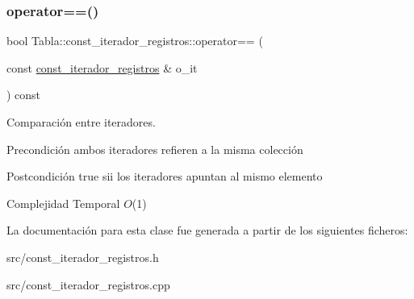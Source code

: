 \subsubsection{\texorpdfstring{operator==()}{operator==()}}
{\footnotesize\ttfamily bool Tabla\+::const\+\_\+iterador\+\_\+registros\+::operator== (\begin{DoxyParamCaption}\item[{const \mbox{\hyperlink{classTabla_1_1const__iterador__registros}{const\+\_\+iterador\+\_\+registros}} \&}]{o\+\_\+it }\end{DoxyParamCaption}) const}



Comparación entre iteradores. 

\begin{DoxyPrecond}{Precondición}
ambos iteradores refieren a la misma colección 
\end{DoxyPrecond}
\begin{DoxyPostcond}{Postcondición}
true sii los iteradores apuntan al mismo elemento
\end{DoxyPostcond}

\begin{DoxyDescription}
\item[Complejidad Temporal]$O$(1)
\end{DoxyDescription}

La documentación para esta clase fue generada a partir de los siguientes ficheros\+:\begin{DoxyCompactItemize}
\item 
src/const\+\_\+iterador\+\_\+registros.\+h\item 
src/const\+\_\+iterador\+\_\+registros.\+cpp\end{DoxyCompactItemize}
